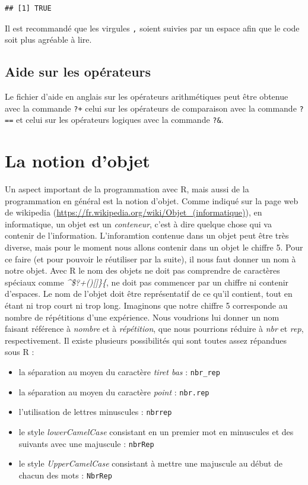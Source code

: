 \documentclass[]{book}
\providecommand{\tightlist}{%
  \setlength{\itemsep}{0pt}\setlength{\parskip}{0pt}}
\begin{document}
\begin{verbatim}
## [1] TRUE
\end{verbatim}

Il est recommandé que les virgules \texttt{,} soient suivies par un espace afin que le code soit plus agréable à lire.

\hypertarget{aide-sur-les-operateurs}{%
\subsection{Aide sur les opérateurs}\label{aide-sur-les-operateurs}}

Le fichier d'aide en anglais sur les opérateurs arithmétiques peut être obtenue avec la commande \texttt{?\textquotesingle{}+\textquotesingle{}} celui sur les opérateurs de comparaison avec la commande \texttt{?\textquotesingle{}==\textquotesingle{}} et celui sur les opérateurs logiques avec la commande \texttt{?\textquotesingle{}\&\textquotesingle{}}.

\hypertarget{l011object}{%
\section{La notion d'objet}\label{l011object}}

Un aspect important de la programmation avec R, mais aussi de la programmation en général est la notion d'objet. Comme indiqué sur la page web de wikipedia (\url{https://fr.wikipedia.org/wiki/Objet_(informatique)}), en informatique, un objet est un \emph{conteneur}, c'est à dire quelque chose qui va contenir de l'information. L'inforamtion contenue dans un objet peut être très diverse, mais pour le moment nous allons contenir dans un objet le chiffre 5. Pour ce faire (et pour pouvoir le réutiliser par la suite), il nous faut donner un nom à notre objet. Avec R le nom des objets ne doit pas comprendre de caractères spéciaux comme \emph{\^{}\$?\textbar+(){[}{]}\}\{}, ne doit pas commencer par un chiffre ni contenir d'espaces. Le nom de l'objet doit être représentatif de ce qu'il contient, tout en étant ni trop court ni trop long. Imaginons que notre chiffre 5 corresponde au nombre de répétitions d'une expérience. Nous voudrions lui donner un nom faisant référence à \emph{nombre} et à \emph{répétition}, que nous pourrions réduire à \emph{nbr} et \emph{rep}, respectivement. Il existe plusieurs possibilités qui sont toutes assez répandues sous R :

\begin{itemize}
\tightlist
\item
  la séparation au moyen du caractère \emph{tiret bas} : \texttt{nbr\_rep}
\item
  la séparation au moyen du caractère \emph{point} : \texttt{nbr.rep}
\item
  l'utilisation de lettres minuscules : \texttt{nbrrep}
\item
  le style \emph{lowerCamelCase} consistant en un premier mot en minuscules et des suivants avec une majuscule : \texttt{nbrRep}
\item
  le style \emph{UpperCamelCase} consistant à mettre une majuscule au début de chacun des mots : \texttt{NbrRep}
\end{itemize}
\end{document}
